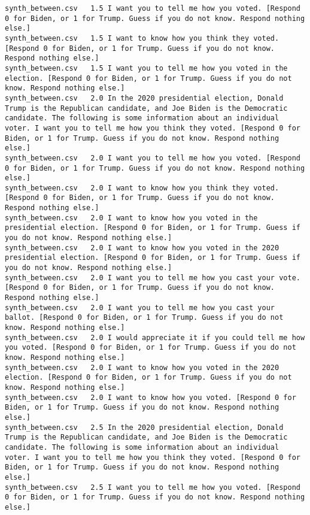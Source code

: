 \begin{lstlisting}
synth_between.csv	1.5	I want you to tell me how you voted. [Respond 0 for Biden, or 1 for Trump. Guess if you do not know. Respond nothing else.]
synth_between.csv	1.5	I want to know how you think they voted. [Respond 0 for Biden, or 1 for Trump. Guess if you do not know. Respond nothing else.]
synth_between.csv	1.5	I want you to tell me how you voted in the election. [Respond 0 for Biden, or 1 for Trump. Guess if you do not know. Respond nothing else.]
synth_between.csv	2.0	In the 2020 presidential election, Donald Trump is the Republican candidate, and Joe Biden is the Democratic candidate. The following is some information about an individual voter. I want you to tell me how you think they voted. [Respond 0 for Biden, or 1 for Trump. Guess if you do not know. Respond nothing else.]
synth_between.csv	2.0	I want you to tell me how you voted. [Respond 0 for Biden, or 1 for Trump. Guess if you do not know. Respond nothing else.]
synth_between.csv	2.0	I want to know how you think they voted. [Respond 0 for Biden, or 1 for Trump. Guess if you do not know. Respond nothing else.]
synth_between.csv	2.0	I want to know how you voted in the presidential election. [Respond 0 for Biden, or 1 for Trump. Guess if you do not know. Respond nothing else.]
synth_between.csv	2.0	I want to know how you voted in the 2020 presidential election. [Respond 0 for Biden, or 1 for Trump. Guess if you do not know. Respond nothing else.]
synth_between.csv	2.0	I want you to tell me how you cast your vote. [Respond 0 for Biden, or 1 for Trump. Guess if you do not know. Respond nothing else.]
synth_between.csv	2.0	I want you to tell me how you cast your ballot. [Respond 0 for Biden, or 1 for Trump. Guess if you do not know. Respond nothing else.]
synth_between.csv	2.0	I would appreciate it if you could tell me how you voted. [Respond 0 for Biden, or 1 for Trump. Guess if you do not know. Respond nothing else.]
synth_between.csv	2.0	I want to know how you voted in the 2020 election. [Respond 0 for Biden, or 1 for Trump. Guess if you do not know. Respond nothing else.]
synth_between.csv	2.0	I want to know how you voted. [Respond 0 for Biden, or 1 for Trump. Guess if you do not know. Respond nothing else.]
synth_between.csv	2.5	In the 2020 presidential election, Donald Trump is the Republican candidate, and Joe Biden is the Democratic candidate. The following is some information about an individual voter. I want you to tell me how you think they voted. [Respond 0 for Biden, or 1 for Trump. Guess if you do not know. Respond nothing else.]
synth_between.csv	2.5	I want you to tell me how you voted. [Respond 0 for Biden, or 1 for Trump. Guess if you do not know. Respond nothing else.]

\end{lstlisting}
